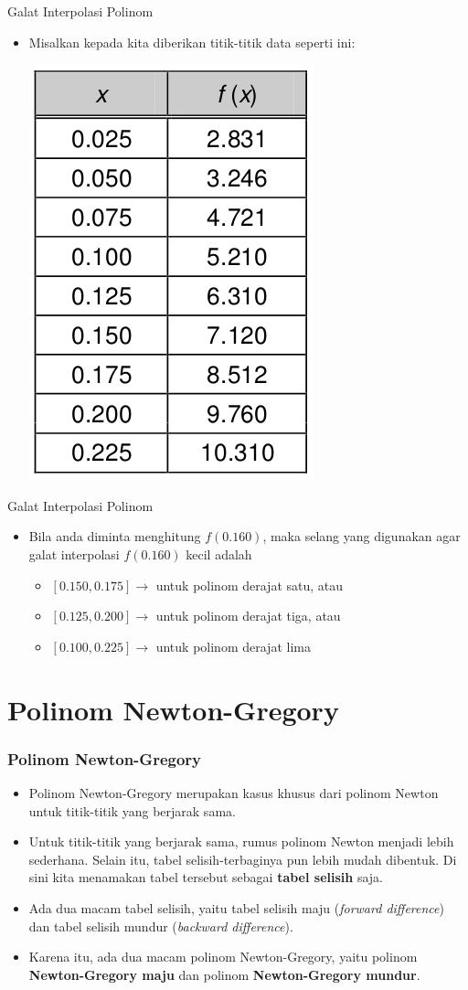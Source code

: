 \documentclass[pdflatex,compress,mathserif]{beamer}
\begin{document}
\begin{frame}{Galat Interpolasi Polinom}
	\begin{itemize}
		\item Misalkan kepada kita diberikan titik-titik data seperti ini:
		\begin{center}
			\includegraphics[width=0.3\linewidth]{img/img18}
		\end{center}
	\end{itemize}
\end{frame}

\begin{frame}{Galat Interpolasi Polinom}
	\begin{itemize}
		\item Bila anda diminta menghitung $ f(0.160) $, maka selang yang digunakan agar galat interpolasi $ f(0.160) $ kecil adalah
		\begin{itemize}
			\item[] $ [0.150, 0.175] \rightarrow $ untuk polinom derajat satu, atau
			\item[] $ [0.125, 0.200] \rightarrow $ untuk polinom derajat tiga, atau
			\item[] $ [0.100, 0.225] \rightarrow $ untuk polinom derajat lima
		\end{itemize}
	\end{itemize}
\end{frame}

\section{Polinom Newton-Gregory}

\begin{frame}
	\frametitle{Polinom Newton-Gregory}
	\begin{itemize}
		\item Polinom Newton-Gregory merupakan kasus khusus dari polinom Newton untuk titik-titik yang berjarak sama.
		\item Untuk titik-titik yang berjarak sama, rumus polinom Newton menjadi lebih sederhana. Selain itu, tabel selisih-terbaginya pun lebih mudah dibentuk. Di sini kita menamakan tabel tersebut sebagai \textbf{tabel selisih} saja.
		\item Ada dua macam tabel selisih, yaitu tabel selisih maju (\textit{forward difference}) dan tabel selisih mundur (\textit{backward difference}).
		\item Karena itu, ada dua macam polinom Newton-Gregory, yaitu polinom \textbf{Newton-Gregory maju} dan polinom \textbf{Newton-Gregory mundur}.
	\end{itemize}
\end{frame}
\end{document}
